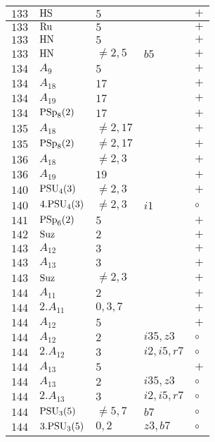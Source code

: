 \documentclass[a4paper, 11pt]{article}
\begin{document}
\begin{longtable}{lllll}
		$133$ & ${\rm HS}$ & $5$ &  & $+$ \\ \hline
		$133$ & ${\rm Ru}$ & $5$ &  & $+$ \\ \hline
		$133$ & ${\rm HN}$ & $5$ &  & $+$ \\ \hline
		$133$ & ${\rm HN}$ & $\neq 2,5$ & $b5$ & $+$ \\ \hline
		$134$ & $A_{9}$ & $5$ &  & $+$ \\ \hline
		$134$ & $A_{18}$ & $17$ &  & $+$ \\ \hline
		$134$ & $A_{19}$ & $17$ &  & $+$ \\ \hline
		$134$ & ${\rm PSp}_{8}(2)$ & $17$ &  & $+$ \\ \hline
		$135$ & $A_{18}$ & $\neq 2,17$ &  & $+$ \\ \hline
		$135$ & ${\rm PSp}_{8}(2)$ & $\neq 2,17$ &  & $+$ \\ \hline
		$136$ & $A_{18}$ & $\neq 2,3$ &  & $+$ \\ \hline
		$136$ & $A_{19}$ & $19$ &  & $+$ \\ \hline
		$140$ & ${\rm PSU}_{4}(3)$ & $\neq 2,3$ &  & $+$ \\ \hline
		$140$ & $4.{\rm PSU}_{4}(3)$ & $\neq 2,3$ & $i1$ & $\circ$ \\ \hline
		$141$ & ${\rm PSp}_{6}(2)$ & $5$ &  & $+$ \\ \hline
		$142$ & ${\rm Suz}$ & $2$ &  & $+$ \\ \hline
		$143$ & $A_{12}$ & $3$ &  & $+$ \\ \hline
		$143$ & $A_{13}$ & $3$ &  & $+$ \\ \hline
		$143$ & ${\rm Suz}$ & $\neq 2,3$ &  & $+$ \\ \hline
		$144$ & $A_{11}$ & $2$ &  & $+$ \\ \hline
		$144$ & $2.A_{11}$ & $0,3,7$ &  & $+$ \\ \hline
		$144$ & $A_{12}$ & $5$ &  & $+$ \\ \hline
		$144$ & $A_{12}$ & $2$ & $i35, z3$ & $\circ$ \\ \hline
		$144$ & $2.A_{12}$ & $3$ & $i2, i5, r7$ & $\circ$ \\ \hline
		$144$ & $A_{13}$ & $5$ &  & $+$ \\ \hline
		$144$ & $A_{13}$ & $2$ & $i35, z3$ & $\circ$ \\ \hline
		$144$ & $2.A_{13}$ & $3$ & $i2, i5, r7$ & $\circ$ \\ \hline
		$144$ & ${\rm PSU}_{3}(5)$ & $\neq 5,7$ & $b7$ & $\circ$ \\ \hline
		$144$ & $3.{\rm PSU}_{3}(5)$ & $0, 2$ & $z3, b7$ & $\circ$ \\ \hline

\end{longtable}
\end{document}
